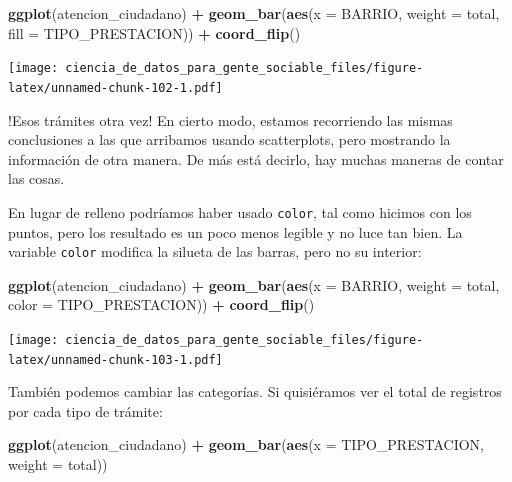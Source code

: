 \documentclass[spanish,]{book}
\newenvironment{Shaded}{\begin{snugshade}}{\end{snugshade}}
\newcommand{\DataTypeTok}[1]{\textcolor[rgb]{0.13,0.29,0.53}{#1}}
\newcommand{\KeywordTok}[1]{\textcolor[rgb]{0.13,0.29,0.53}{\textbf{#1}}}
\newcommand{\NormalTok}[1]{#1}
\newcommand{\OperatorTok}[1]{\textcolor[rgb]{0.81,0.36,0.00}{\textbf{#1}}}
\newcommand{\StringTok}[1]{\textcolor[rgb]{0.31,0.60,0.02}{#1}}
\begin{document}
\begin{Shaded}
\begin{Highlighting}[]
\KeywordTok{ggplot}\NormalTok{(atencion_ciudadano) }\OperatorTok{+}
\StringTok{    }\KeywordTok{geom_bar}\NormalTok{(}\KeywordTok{aes}\NormalTok{(}\DataTypeTok{x =}\NormalTok{ BARRIO, }\DataTypeTok{weight =}\NormalTok{ total, }\DataTypeTok{fill =}\NormalTok{ TIPO_PRESTACION)) }\OperatorTok{+}
\StringTok{    }\KeywordTok{coord_flip}\NormalTok{()}
\end{Highlighting}
\end{Shaded}

\texttt{[image: ciencia\_de\_datos\_para\_gente\_sociable\_files/figure-latex/unnamed-chunk-102-1.pdf]}

!Esos trámites otra vez! En cierto modo, estamos recorriendo las mismas conclusiones a las que arribamos usando scatterplots, pero mostrando la información de otra manera. De más está decirlo, hay muchas maneras de contar las cosas.

En lugar de relleno podríamos haber usado \texttt{color}, tal como hicimos con los puntos, pero los resultado es un poco menos legible y no luce tan bien. La variable \texttt{color} modifica la silueta de las barras, pero no su interior:

\begin{Shaded}
\begin{Highlighting}[]
\KeywordTok{ggplot}\NormalTok{(atencion_ciudadano) }\OperatorTok{+}
\StringTok{    }\KeywordTok{geom_bar}\NormalTok{(}\KeywordTok{aes}\NormalTok{(}\DataTypeTok{x =}\NormalTok{ BARRIO, }\DataTypeTok{weight =}\NormalTok{ total, }\DataTypeTok{color =}\NormalTok{ TIPO_PRESTACION)) }\OperatorTok{+}
\StringTok{    }\KeywordTok{coord_flip}\NormalTok{()}
\end{Highlighting}
\end{Shaded}

\texttt{[image: ciencia\_de\_datos\_para\_gente\_sociable\_files/figure-latex/unnamed-chunk-103-1.pdf]}

También podemos cambiar las categorías. Si quisiéramos ver el total de registros por cada tipo de trámite:

\begin{Shaded}
\begin{Highlighting}[]
\KeywordTok{ggplot}\NormalTok{(atencion_ciudadano) }\OperatorTok{+}
\StringTok{    }\KeywordTok{geom_bar}\NormalTok{(}\KeywordTok{aes}\NormalTok{(}\DataTypeTok{x =}\NormalTok{ TIPO_PRESTACION, }\DataTypeTok{weight =}\NormalTok{ total)) }
\end{Highlighting}
\end{Shaded}
\end{document}
